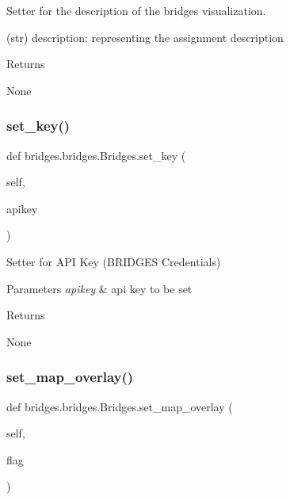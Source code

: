 Setter for the description of the bridges visualization. 

(str) description\+: representing the assignment description \begin{DoxyReturn}{Returns}


None 
\end{DoxyReturn}
\mbox{\label{classbridges_1_1bridges_1_1_bridges_a5841bc54e3663249e76f4b34f5a3a593}} 
\subsubsection{\texorpdfstring{set\+\_\+key()}{set\_key()}}
{\footnotesize\ttfamily def bridges.\+bridges.\+Bridges.\+set\+\_\+key (\begin{DoxyParamCaption}\item[{}]{self,  }\item[{}]{apikey }\end{DoxyParamCaption})}



Setter for A\+PI Key (B\+R\+I\+D\+G\+ES Credentials) 


\begin{DoxyParams}{Parameters}
{\em apikey} & api key to be set \\
\hline
\end{DoxyParams}
\begin{DoxyReturn}{Returns}


None 
\end{DoxyReturn}
\mbox{\label{classbridges_1_1bridges_1_1_bridges_ae9ed34b5878d9d120949da0b7e4d2911}} 
\subsubsection{\texorpdfstring{set\+\_\+map\+\_\+overlay()}{set\_map\_overlay()}}
{\footnotesize\ttfamily def bridges.\+bridges.\+Bridges.\+set\+\_\+map\+\_\+overlay (\begin{DoxyParamCaption}\item[{}]{self,  }\item[{}]{flag }\end{DoxyParamCaption})}



